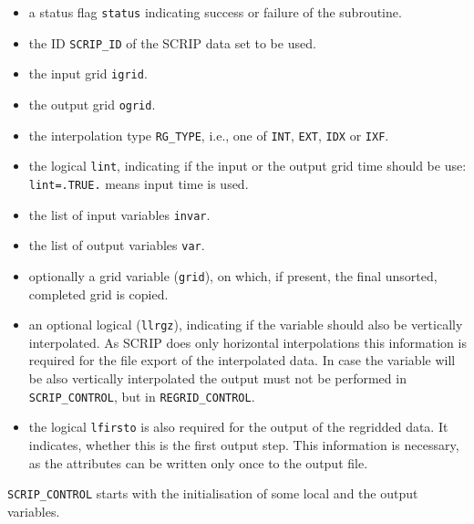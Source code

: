 \documentclass[11pt,twoside]{article}
\begin{document}
\begin{itemize} %
\item a status flag \verb|status| indicating success or failure of the
subroutine.
\item the ID \verb|SCRIP_ID| of the SCRIP data set to be used.
\item the input grid \verb|igrid|.
\item the output grid \verb|ogrid|.
\item the interpolation type \verb|RG_TYPE|, i.e., one
of \verb|INT|, \verb|EXT|, \verb|IDX| or \verb|IXF|.
\item the logical \verb|lint|, indicating if the input or the output
grid time should be use: \verb|lint=.TRUE.| means input time is used.
\item the list of input variables \verb|invar|.
\item the list of output variables \verb|var|.
\item optionally a grid variable (\verb|grid|), on which, if present, the final
unsorted, completed grid is copied.
\item an optional logical (\verb|llrgz|), indicating if the variable
should also be vertically interpolated. As SCRIP does only horizontal
interpolations this information is required for the file export of the
interpolated data. In case the variable will be also vertically
interpolated the output must not be performed in \verb|SCRIP_CONTROL|, but
in \verb|REGRID_CONTROL|.
\item the logical \verb|lfirsto| is also required for the output of the
regridded data. It indicates, whether this is the first output
step. This information is necessary, as the attributes can be written
only once to the output file.
\end{itemize}  %
 \verb|SCRIP_CONTROL| starts with the initialisation of some local and
 the output variables.
\end{document}
